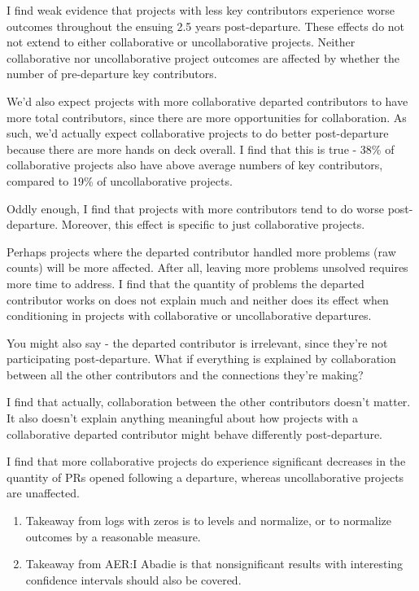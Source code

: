 \documentclass[12pt,notitlepage]{article}
\begin{document}
I find weak evidence that projects with less key contributors experience worse outcomes throughout the ensuing 2.5 years post-departure. These effects do not not extend to either collaborative or uncollaborative projects. Neither collaborative nor uncollaborative project outcomes are affected by whether the number of pre-departure key contributors. 

We'd also expect projects with more collaborative departed contributors to have more total contributors, since there are more opportunities for collaboration. As such, we'd actually expect collaborative projects to do better post-departure because there are more hands on deck overall. I find that this is true - 38\% of collaborative projects also have above average numbers of key contributors, compared to 19\% of uncollaborative projects. 

Oddly enough, I find that projects with more contributors tend to do worse post-departure. Moreover, this effect is specific to just collaborative projects. 

Perhaps projects where the departed contributor handled more problems (raw counts) will be more affected. After all, leaving more problems unsolved requires more time to address. I find that the quantity of problems the departed contributor works on does not explain much and neither does its effect when conditioning in projects with collaborative or uncollaborative departures. 

You might also say - the departed contributor is irrelevant, since they're not participating post-departure. What if everything is explained by collaboration between all the other contributors and the connections they're making?

I find that actually, collaboration between the other contributors doesn't matter. It also doesn't explain anything meaningful about how projects with a collaborative departed contributor might behave differently post-departure. 




I find that more collaborative projects do experience significant decreases in the quantity of PRs opened following a departure, whereas uncollaborative projects are unaffected. 

\begin{enumerate}
    \item Takeaway from logs with zeros is to levels and normalize, or to normalize outcomes by a reasonable measure.
    \item Takeaway from AER:I Abadie is that nonsignificant results with interesting confidence intervals should also be covered. 
\end{enumerate}
\end{document}
